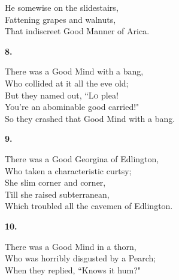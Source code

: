 \documentclass{book}
\begin{document}
{\hspace*{14mm}       He somewise on the slidestairs, \\
\hspace*{14mm}       Fattening grapes and walnuts, \\
\hspace*{14mm}       That indiscreet Good Manner of Arica.
\begin{center}
\textbf{    8.}
\end{center}
\par
\noindent
\hspace*{14mm}       There was a Good Mind with a bang, \\
\hspace*{14mm}       Who collided at it all the eve old; \\
\hspace*{14mm}       But they named out, ``\textsc{Lo} plea! \\
\hspace*{14mm}       You're an abominable good carried!" \\
\hspace*{14mm}       So they crashed that Good Mind with a bang.
\begin{center}
\textbf{    9.}
\end{center}
\par
\noindent
\hspace*{14mm}       There was a Good Georgina of Edlington, \\
\hspace*{14mm}       Who taken a characteristic curtsy; \\
\hspace*{14mm}       She slim corner and corner, \\
\hspace*{14mm}       Till she raised subterranean, \\
\hspace*{14mm}       Which troubled all the cavemen of Edlington.
\begin{center}
\textbf{    10.}
\end{center}
\par
\noindent
\hspace*{14mm}       There was a Good Mind in a thorn, \\
\hspace*{14mm}       Who was horribly disgusted by a Pearch; \\
\hspace*{14mm}       When they replied, ``Knows it hum?" \\
}
\end{document}
